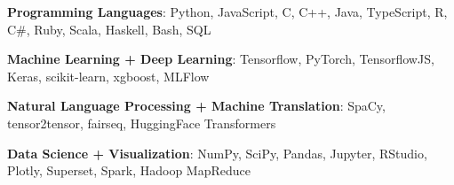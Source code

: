 
\textbf{Programming Languages}: Python, JavaScript, C, C++, Java, TypeScript, R, C\#, Ruby, Scala, Haskell, Bash, SQL %

\textbf{Machine Learning + Deep Learning}: Tensorflow, PyTorch, TensorflowJS, Keras, scikit-learn, xgboost, MLFlow %

\textbf{Natural Language Processing + Machine Translation}: SpaCy, tensor2tensor, fairseq, HuggingFace Transformers %


\textbf{Data Science + Visualization}: NumPy, SciPy, Pandas, Jupyter, RStudio, Plotly, Superset, Spark, Hadoop MapReduce %








